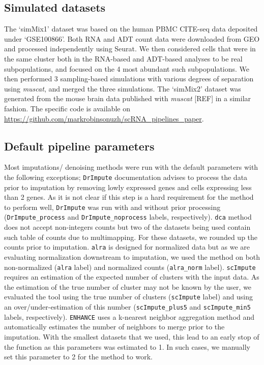 \documentclass{bmcart}
\begin{document}
\subsection*{Simulated datasets}
The `simMix1' dataset was based on the human PBMC CITE-seq data deposited under `GSE100866'. Both RNA and ADT count data were downloaded from GEO and processed independently using Seurat. We then considered cells that were in the same cluster both in the RNA-based and ADT-based analyses to be real subpopulations, and focused on the 4 most abundant such subpopulations. We then performed 3 sampling-based simulations with various degrees of separation using \textit{muscat}, and merged the three simulations. The `simMix2' dataset was generated from the mouse brain data published with \textit{muscat} [REF] in a similar fashion. The specific code is available on \url{https://github.com/markrobinsonuzh/scRNA\_pipelines\_paper}.

\subsection*{Default pipeline parameters}

Most imputations/ denoising methods were run with the default parameters with the following exceptions; \texttt{DrImpute} documentation advises to process the data prior to imputation by removing lowly expressed genes and cells expressing less than 2 genes. As it is not clear if this step is a hard requirement for the method to perform well, \texttt{DrImpute} was run with and without prior processing (\texttt{DrImpute\_process} and \texttt{DrImpute\_noprocess} labels, respectively). \texttt{dca} method does not accept non-integers counts but two of the datasets being used contain such table of counts due to multimapping. For these datasets, we rounded up the counts prior to imputation. \texttt{alra} is designed for normalized data but as we are evaluating normalization downstream to imputation, we used the method on both non-normalized (\texttt{alra} label) and normalized counts (\texttt{alra\_norm} label). \texttt{scImpute} requires an estimation of the expected number of clusters with the input data. As the estimation of the true number of cluster may not be known by the user, we evaluated the tool using the true number of clusters (\texttt{scImpute} label) and using an over/under-estimation of this number (\texttt{scImpute\_plus5} and \texttt{scImpute\_min5} labels, respectively). \texttt{ENHANCE} uses a k-nearest neighbor aggregation method and automatically estimates the number of neighbors to merge prior to the imputation. With the smallest datasets that we used, this lead to an early stop of the function as this parameters was estimated to 1. In such cases, we manually set this parameter to 2 for the method to work. 
\end{document}
